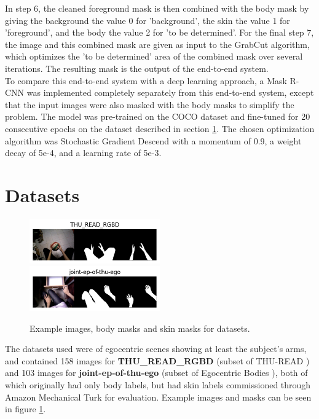 \documentclass[conference]{IEEEtran}
\begin{document}
In step 6, the cleaned foreground mask is then combined with the body mask by giving the background the value 0 for 'background', the skin the value 1 for 'foreground', and the body the value 2 for 'to be determined'. For the final step 7, the image and this combined mask are given as input to the GrabCut algorithm, which optimizes the 'to be determined' area of the combined mask over several iterations. The resulting mask is the output of the end-to-end system. \\

To compare this end-to-end system with a deep learning approach, a Mask R-CNN was implemented completely separately from this end-to-end system, except that the input images were also masked with the body masks to simplify the problem. The model was pre-trained on the COCO dataset and fine-tuned for 20 consecutive epochs on the dataset described in section \ref{sec:datasets}. The chosen optimization algorithm was Stochastic Gradient Descend with a momentum of 0.9, a weight decay of 5e-4, and a learning rate of 5e-3.

\section{Datasets}
\label{sec:datasets}

\begin{figure}[h]
	\begin{center}
		\includegraphics[width=0.5\textwidth]{images/THU_READ_RGBD_example.png} \\
		\includegraphics[width=0.5\textwidth]{images/joint-ep-of-thu-ego_example.png}
	\end{center}
	\caption{Example images, body masks and skin masks for datasets.}
	\label{fig:datasets}
\end{figure}

The datasets used were of egocentric scenes showing at least the subject's arms, and contained 158 images for \textbf{THU\_READ\_RGBD} (subset of THU-READ \cite{b12}) and 103 images for \textbf{joint-ep-of-thu-ego} (subset of Egocentric Bodies \cite{b13}), both of which originally had only body labels, but had skin labels commissioned through Amazon Mechanical Turk for evaluation. Example images and masks can be seen in figure \ref{fig:datasets}.
\end{document}
